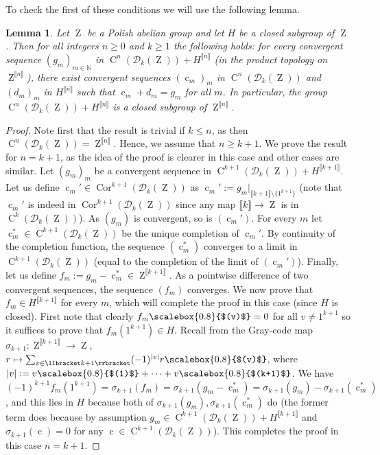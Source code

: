 \documentclass[a4paper,12pt,reqno]{amsart}
\newtheorem{lemma}[theorem]{Lemma}
\theoremstyle{definition}
\def\to{\rightarrow}
\newcommand*{\sbr}[1]{\scalebox{0.8}{$(#1)$}}
\newcommand*{\db}[1]{\llbracket #1\rrbracket}
\newcommand{\mc}{\mathcal}
\newcommand{\mb}{\mathbb}
\DeclareMathOperator{\ab}{Z}
\DeclareMathOperator{\q}{c}
\DeclareMathOperator{\cu}{C}
\DeclareMathOperator{\cor}{Cor}
\begin{document}
To check the first of these conditions we will use the following lemma.

\begin{lemma}\label{lem:closure-sum-of-cu-and-h}
Let $\ab$ be a Polish abelian group and let $H$ be a closed subgroup of $\ab$. Then for all integers $n\ge 0$ and $k\ge 1$ the following holds: for every convergent sequence $(g_m)_{m\in \mb{N}}$ in $\cu^n(\mc{D}_k(\ab))+H^{\db{n}}$ (in the product topology on $\ab^{\db{n}}$), there exist convergent sequences $(\q_m)_m$ in $\cu^n(\mc{D}_k(\ab))$ and $(d_m)_m$ in $H^{\db{n}}$ such that $\q_m+d_m=g_m$ for all $m$. In particular, the group $\cu^n(\mc{D}_k(\ab))+H^{\db{n}}$ is a closed subgroup of $\ab^{\db{n}}$.
\end{lemma}

\begin{proof}
Note first that the result is trivial if $k\le n$, as then $\cu^n(\mc{D}_k(\ab))=\ab^{\db{n}}$. Hence, we assume that $n\ge k+1$. We prove the result for $n=k+1$, as the idea of the proof is clearer in this case and other cases are similar. Let $(g_m)_m$ be a convergent sequence in $\cu^{k+1}(\mc{D}_k(\ab))+H^{\db{k+1}}$. Let us define $\q_m'\in \cor^{k+1}(\mc{D}_k(\ab))$ as $\q_m':=g_m|_{\db{k+1}\setminus\{1^{k+1}\}}$ (note that $\q_m'$ is indeed in $\cor^{k+1}(\mc{D}_k(\ab))$ since any map $\db{k}\to \ab$ is in $\cu^k(\mc{D}_k(\ab))$). As $(g_m)$ is convergent, so is $(\q_m')$. For every $m$ let $\q_m^*\in \cu^{k+1}(\mc{D}_k(\ab))$ be the unique completion of $\q_m'$. By continuity of the completion function,  the sequence $(\q_m^*)$ converges to a limit in $\cu^{k+1}(\mc{D}_k(\ab))$ (equal to the completion of the limit of $(\q_m')$). Finally, let us define $f_m:=g_m-\q_m^*\in \ab^{\db{k+1}}$. As a pointwise difference of two convergent sequences, the sequence $(f_m)$ converges. We now prove that $f_m\in H^{\db{k+1}}$ for every $m$, which will complete the proof in this case (since $H$ is closed). First note that clearly $f_m\sbr{v}=0$ for all $v\not=1^{k+1}$ so it suffices to prove that $f_m(1^{k+1})\in H$. Recall from  \cite[Definition 2.2.22]{Cand:Notes1} the Gray-code map $\sigma_{k+1}:\ab^{\db{k+1}}\to\ab$, $r\mapsto \sum_{v\in \db{k+1}} (-1)^{|v|}r\sbr{v}$, where $|v|:=v\sbr{1}+\cdots+v\sbr{k+1}$. We have $(-1)^{k+1}f_m(1^{k+1}) = \sigma_{k+1}(f_m) = \sigma_{k+1}(g_m-\q_m^*)=\sigma_{k+1}(g_m)-\sigma_{k+1}(\q_m^*)$, and this lies in $H$ because both of $\sigma_{k+1}(g_m), \sigma_{k+1}(\q_m^*)$ do (the former term does because by assumption $g_m\in \cu^{k+1}(\mc{D}_k(\ab))+H^{\db{k+1}}$ and $\sigma_{k+1}(\q)=0$ for any $\q\in \cu^{k+1}(\mc{D}_k(\ab))$). This completes the proof in this case $n=k+1$.


\end{proof}
\end{document}
